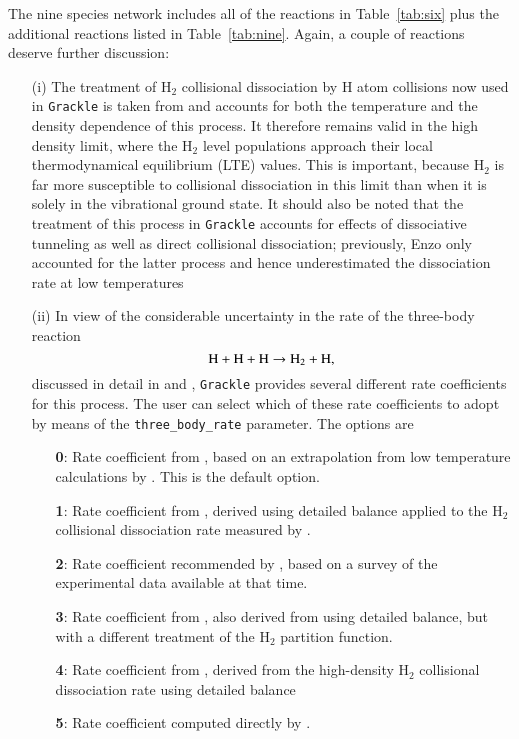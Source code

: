 The nine species network includes all of the reactions in Table~\ref{tab:six} plus the additional reactions listed in Table~\ref{tab:nine}. Again,
a couple of reactions deserve further discussion:
\begin{enumerate}
\item[(i)] The treatment of H$_{2}$ collisional dissociation by H atom collisions now used in \texttt{Grackle} is taken from \citet{1996ApJ...461..265M} and 
accounts for both the temperature and the density dependence of this process. It therefore remains valid in the high density limit, where the H$_{2}$
level populations approach their local thermodynamical equilibrium (LTE) values. This is important, because H$_{2}$ is far more susceptible to
collisional dissociation in this limit than when it is solely in the vibrational ground state. It should also be noted that the treatment of this process
in \texttt{Grackle} accounts for effects of dissociative tunneling as well as direct collisional dissociation; previously, Enzo only accounted for the latter
process and hence underestimated the dissociation rate at low temperatures \citep{2014MNRAS.443.1979L,2015MNRAS.451.2082G}
\item[(ii)] In view of the considerable uncertainty in the rate of the three-body reaction
\begin{equation}
{\rm H + H + H} \rightarrow {\rm H_{2} + H},
\end{equation}
discussed in detail in \citet{2008AIPC..990...25G} and \citet{2011ApJ...726...55T}, \texttt{Grackle} provides several different rate coefficients for this process. The user can
select which of these rate coefficients to adopt by means of the \texttt{three\_body\_rate} parameter. The options are
\begin{enumerate}
\item[{\bf 0}:]  Rate coefficient from \citet{2002Sci...295...93A}, based on an extrapolation from low temperature calculations by \citet{1987JChPh..87..314O}. This is the default option.
\item[{\bf 1}:]  Rate coefficient from \citet{1983ApJ...271..632P}, derived using detailed balance applied to the H$_{2}$ collisional dissociation rate measured by \citet{1967JChPh..47...54J}.
\item[{\bf 2}:]  Rate coefficient recommended by \citet{1983JPCRD..12..531C}, based on a survey of the experimental data available at that time. 
\item[{\bf 3}:]  Rate coefficient from \citet{2007MNRAS.377..705F}, also derived from \citet{1967JChPh..47...54J} using detailed balance, but with a different treatment of the H$_{2}$ partition
function. 
\item[{\bf 4}:]  Rate coefficient from \citet{2008AIPC..990...25G}, derived from the \citet{1996ApJ...461..265M} high-density H$_2$ collisional dissociation rate using detailed balance
\item[{\bf 5}:]  Rate coefficient computed directly by \citet{2013ApJ...773L..25F}.
\end{enumerate}
\end{enumerate}

